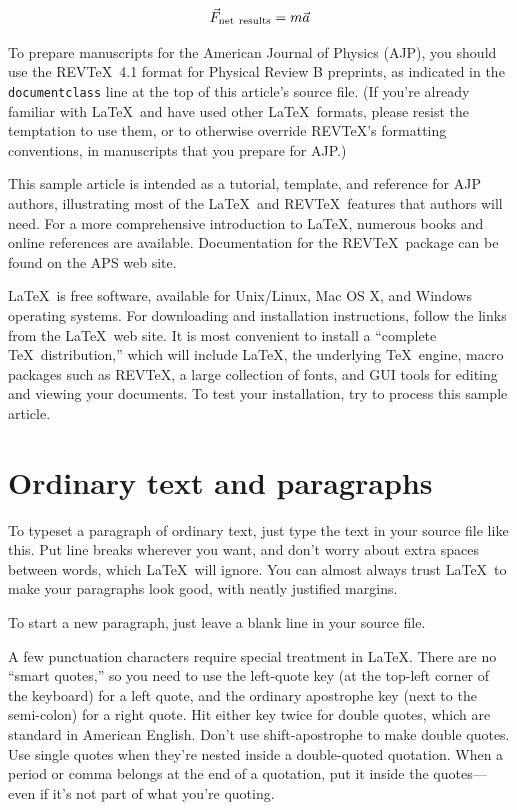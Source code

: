 \documentclass[prb,preprint]{revtex4-1}
\begin{document}
\begin{equation}
\vec{F}_{{\rm net\ results}} = m\vec{a}
\end{equation}

To prepare manuscripts for the American Journal of Physics (AJP), 
you should use the REV\TeX\ 4.1 format for Physical Review B
preprints, as indicated in the \texttt{documentclass} line at the top 
of this article's source file.  (If you're already familiar with 
\LaTeX\ and have used other \LaTeX\ formats, please resist the 
temptation to use them, or to otherwise override REV\TeX's formatting 
conventions, in manuscripts that you prepare for AJP.)

This sample article is intended as a tutorial, template, and reference for 
AJP authors, illustrating most of the \LaTeX\ and REV\TeX\ features that 
authors will need.  For a more comprehensive introduction to \LaTeX, 
numerous books and online references are available.\cite{latexsite, 
wikibook, latexbook}  Documentation for the REV\TeX\ package 
can be found on the APS web site.\cite{revtex}

\LaTeX\ is free software, available for Unix/Linux, Mac OS X, and Windows
operating systems. For downloading and installation instructions, follow
the links from the \LaTeX\ web site.\cite{latexsite} It is most
convenient\cite{cloudLaTeX} to install a ``complete \TeX\ distribution,'' 
which will include \LaTeX, the underlying \TeX\ engine, macro packages 
such as REV\TeX, a large collection of fonts, and GUI tools for editing 
and viewing your documents.  To test your installation, try to process
this sample article.


\section{Ordinary text and paragraphs}

To typeset a paragraph of ordinary text, just type the text in your source
file like this. Put line breaks
wherever
you
want, and don't      worry      about      extra      spaces      between      words, which \LaTeX\ will ignore.  You can almost always trust \LaTeX\ to make your paragraphs look good, with neatly justified margins.  %

To start a new paragraph, just leave a blank line in your source file.

A few punctuation characters require special treatment in \LaTeX. There 
are no ``smart quotes,'' so you need to use the left-quote key (at the 
top-left corner of the keyboard) for a left quote, and the ordinary apostrophe
key (next to the semi-colon) for a right quote. Hit either key twice for double
quotes, which are standard in American English.  Don't use shift-apostrophe
to make double quotes.  Use single quotes when they're nested inside a 
double-quoted quotation.  When a period or comma belongs at the end of
a quotation, put it inside the quotes---even if it's not part of what you're
quoting.\cite{nevermindlogic}
\end{document}

